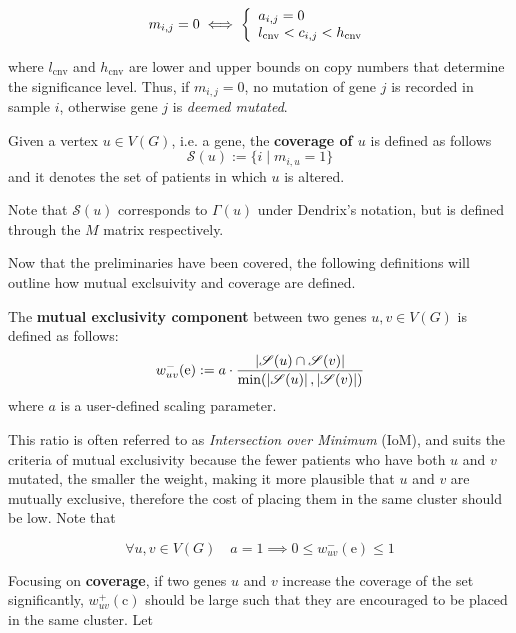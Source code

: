 \begin{equation}
    m_{i, j} = 0 \iff \soe{l}{a_{i, j} = 0 \\ l_{\mathrm{cnv}} < c_{i, j} < h_{\mathrm{cnv}}}
\end{equation}

where $l_{\mathrm{cnv}}$ and $h_{\mathrm{cnv}}$ are lower and upper bounds on copy numbers that determine the significance level. Thus, if $m_{i, j} = 0$, no mutation of gene $j$ is recorded in sample $i$, otherwise gene $j$ is \textit{deemed mutated}.

\begin{definition}
    Given a vertex $u \in V(G)$, i.e. a gene, the \textbf{coverage of $u$} is defined as follows $$\mathscr{S}(u) := \{i \mid m_{i, u} = 1\}$$ and it denotes the set of patients in which $u$ is altered.
\end{definition}

Note that $\mathscr{S}(u)$ corresponds to $\Gamma(u)$ under Dendrix's notation, but is defined through the $M$ matrix respectively.

Now that the preliminaries have been covered, the following definitions will outline how mutual exclsuivity and coverage are defined.

\begin{definition} \label{me_comp}
    The \textbf{mutual exclusivity component} between two genes $u, v \in V(G)$ is defined as follows: $$w_{uv}^-(\mathrm e) := a \cdot \dfrac{\abs{\mathscr{S}(u) \cap \mathscr{S}(v)}}{\min(\abs{\mathscr{S}(u)}, \abs{\mathscr{S}(v)})}$$ where $a$ is a user-defined scaling parameter.
\end{definition}

This ratio is often referred to as \textit{Intersection over Minimum} (IoM), and suits the criteria of mutual exclusivity because the fewer patients who have both $u$ and $v$ mutated, the smaller the weight, making it more plausible that $u$ and $v$ are mutually exclusive, therefore the cost of placing them in the same cluster should be low. Note that

\begin{equation}\label{neg_weight_constraint}
    \forall u, v \in V(G) \quad a = 1 \implies 0 \le w_{uv}^-(\mathrm e) \le 1
\end{equation}

Focusing on \textbf{coverage}, if two genes $u$ and $v$ increase the coverage of the set significantly, $w_{uv}^+(\mathrm c)$ should be large such that they are encouraged to be placed in the same cluster. Let

